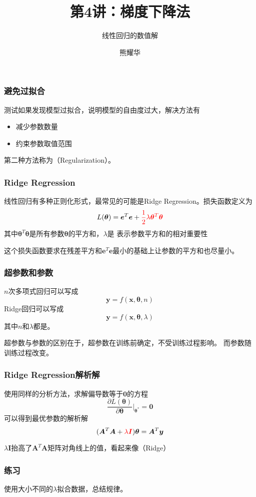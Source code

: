 \documentclass[14pt]{beamer}
\title{第4讲：梯度下降法}
\subtitle{线性回归的数值解}
\author{熊耀华}
\institute{交通工程系}
\newcommand{\mat}[1]{\bm{#1}}
\renewcommand{\vec}[1]{\bm{#1}}
\newcommand{\MA}{\mat{A}}
\newcommand{\MI}{\mat{I}}
\newcommand{\Vy}{\vec{y}}
\newcommand{\Vx}{\vec{x}}
\newcommand{\Ve}{\vec{e}}
\newcommand{\Vt}{\vec{\theta}}
\let\emph\relax %
\begin{document}
\begin{frame}
    \titlepage
\end{frame}

\begin{frame}
  \frametitle{避免过拟合}
  测试如果发现模型过拟合，说明模型的自由度过大，解决方法有
  \begin{itemize}
      \item 减少参数数量
      \item 约束参数取值范围
  \end{itemize}
  第二种方法称为\emph{正则化}（Regularization）。
\end{frame}

\begin{frame}
  \frametitle{Ridge Regression}
  线性回归有多种正则化形式，最常见的可能是Ridge Regression。损失函数定义为
  \begin{equation}
      L(\Vt)=\Ve^T\Ve+{\color{red}\frac{1}{2}\lambda\Vt^T\Vt}
  \end{equation}
  其中$\Vt^T\Vt$是所有参数$\Vt$的平方和，$\lambda$是\emph{超参数}
  表示参数平方和的相对重要性

  这个损失函数要求在残差平方和$\Ve^T\Ve$最小的基础上让参数的平方和也尽量小。
\end{frame}

\begin{frame}
  \frametitle{超参数和参数}
  $n$次多项式回归可以写成
  \[\Vy=f(\Vx,\Vt,n)\]
  Ridge回归可以写成
  \[\Vy=f(\Vx,\Vt,\lambda)\]
  其中$n$和$\lambda$都是\emph{超参数}。
  
  超参数与参数的区别在于，超参数在训练前确定，不受训练过程影响。
  而参数随训练过程改变。
\end{frame}

\begin{frame}
  \frametitle{Ridge Regression解析解}
  使用同样的分析方法，求解偏导数等于$\vec{0}$的方程
  \begin{equation}
      \frac{\partial L(\Vt)}{\partial\Vt}\bigg|_{\Vt^*}=\vec{0}
  \end{equation}
  可以得到最优参数的解析解
  \begin{equation}
      (\MA^T\MA+{\color{red}\lambda\MI})\Vt=\MA^T\Vy
  \end{equation}

  $\lambda\MI$抬高了$\MA^T\MA$矩阵对角线上的值，看起来像\emph{山脊}（Ridge）
\end{frame}

\begin{frame}
  \frametitle{练习}
  使用大小不同的$\lambda$拟合数据，总结规律。
\end{frame}
\end{document}

